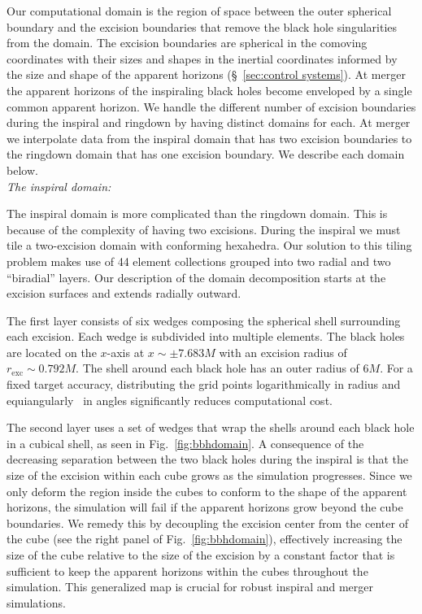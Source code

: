 \begin{bibunit}[unsrtnat]
Our computational domain is the region of space between the outer spherical
boundary and the excision boundaries that remove the black hole singularities
from the domain. The excision boundaries are spherical in the comoving
coordinates with their sizes and shapes in the inertial coordinates informed by
the size and shape of the apparent horizons (\S~\ref{sec:control systems}). At
merger the apparent horizons of
the inspiraling black holes become enveloped by a single common apparent
horizon.  We handle the different number of excision boundaries during the
inspiral and ringdown by having distinct domains for each. At merger we
interpolate data from the inspiral domain that has two excision boundaries to
the ringdown domain that has one excision boundary.  We describe each domain
below.
\\

\noindent\textit{The inspiral domain:}

The inspiral domain is more complicated than the ringdown domain. This is
because of the complexity of having two excisions. During the
inspiral we must tile a two-excision domain with conforming hexahedra. Our
solution to this tiling problem makes use of 44 element collections grouped
into two radial and two ``biradial'' layers. Our description of the domain
decomposition starts at the excision surfaces and extends radially outward.

The first layer consists of six wedges composing the spherical shell surrounding
each excision. Each wedge is subdivided into multiple elements. The black holes
are located on the $x$-axis at $x\sim\pm7.683M$ with an excision radius of
$r_{\mathrm{exc}}\sim0.792M$. The shell around each black hole has an outer
radius of $6M$. For a fixed target accuracy, distributing the grid points
logarithmically in radius and equiangularly~\cite{Sadourny:1972, RONCHI199693}
in angles significantly reduces computational cost.

The second layer uses a set of wedges that wrap the shells around each black
hole in a cubical shell, as seen in Fig.~\ref{fig:bbhdomain}. A consequence
of the decreasing separation between the two black holes during the inspiral is
that the size of the excision within each cube grows as the simulation
progresses. Since we only deform the region inside the cubes to conform to the
shape of the apparent horizons, the simulation will fail if the apparent
horizons grow beyond the cube boundaries. We remedy this by decoupling the
excision center from the center of the cube (see the right panel of
Fig.~\ref{fig:bbhdomain}),
effectively increasing the size of the cube relative to the size of
the excision by a constant factor that is sufficient to keep the apparent
horizons within the cubes throughout the simulation. This generalized map is
crucial for robust inspiral and merger simulations.


\end{bibunit}
